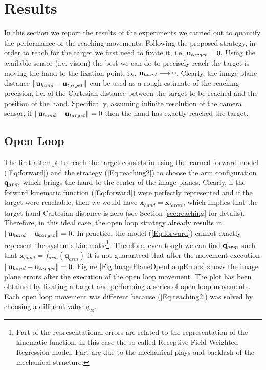 \section{Results}
\label{sec:results}

In this section we report the results of the experiments we carried out
to quantify the performance of the reaching movements. Following the proposed strategy, 
in order to reach for the 
target we first need to fixate it, i.e. $\mathbf{u}_{target} = 0$. Using the available sensor (i.e. vision) the best we can do to precisely reach the target is moving the hand to the fixation point, i.e. $
{\mathbf{u}_{hand}} \longrightarrow 0$. Clearly, the image plane distance $\| \mathbf{u}_{hand} - \mathbf{u}_{target} \|$ can be used as a rough estimate of the reaching precision, i.e. of the Cartesian distance between the target to be reached and the position of the hand. Specifically, assuming infinite resolution of the camera sensor, if $\| \mathbf{u}_{hand} - \mathbf{u}_{target}\| = 0$ then the hand has exactly reached the target.

\subsection{Open Loop}
The first attempt to reach the target consists in using the learned forward model 
(\ref{Eq:forward}) and the strategy (\ref{Eq:reaching2})
to choose the arm configuration $\mathbf q_{arm}$ which brings the hand to the center 
of the image planes. Clearly, if the forward 
kinematic function (\ref{Eq:forward}) were perfectly represented and if the target were reachable, then we would have 
$\mathbf x_{hand} =  \mathbf x_{target}$, which implies that the target-hand Cartesian distance 
 is zero (see Section \ref{sec:reaching} for details). Therefore, in this ideal case, the open loop 
 strategy already results in $\| \mathbf{u}_{hand} - \mathbf{u}_{target} \| = 0$. In practice, the model 
 (\ref{Eq:forward}) cannot exactly represent the system's kinematic\footnote{Part of the representational 
 errors are related to the representation of the kinematic function, in this case the
 so called Receptive Field Weighted Regression model. Part are due to the mechanical plays and backlash of the
 mechanical structure.}. Therefore, even tough we can find $\mathbf q_{arm}$ such that $\mathbf x_{hand}=
 \hat f_{arm}(\mathbf q_{arm})$ it is not guaranteed that after the movement execution 
 $\| \mathbf{u}_{hand} - \mathbf{u}_{target} \| = 0$. Figure \ref{Fig:ImagePlaneOpenLoopErrors}
 shows the image plane errors after the execution of the open loop movement. The plot has been obtained
 by fixating a target and performing a series of open loop movements. Each open loop
 movement was different because (\ref{Eq:reaching2}) was solved 
 by choosing a different value $q_{20}$. 


